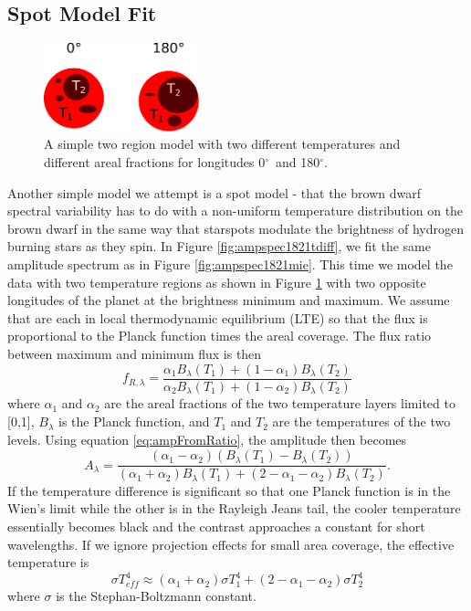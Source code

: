 \documentclass[twocolumn]{aastex6}
\newcommand{\degree}{$^\circ$}
\begin{document}
\subsection{Spot Model Fit}

\begin{figure}
\begin{centering}
\includegraphics[width=0.4\textwidth]{temperature_drawing.pdf}
\caption{A simple two region model with two different temperatures and different areal fractions for longitudes 0\degree\ and 180\degree.}\label{fig:tdiffschem}
\end{centering}
\end{figure}

Another simple model we attempt is a spot model - that the brown dwarf spectral variability has to do with a non-uniform temperature distribution on the brown dwarf in the same way that starspots modulate the brightness of hydrogen burning stars as they spin.
In Figure \ref{fig:ampspec1821tdiff}, we fit the same amplitude spectrum as in Figure \ref{fig:ampspec1821mie}.
This time we model the data with two temperature regions as shown in Figure \ref{fig:tdiffschem} with two opposite longitudes of the planet at the brightness minimum and maximum.
We assume that are each in local thermodynamic equilibrium (LTE) so that the flux is proportional to the Planck function times the areal coverage.
The flux ratio between maximum and minimum flux is then
\begin{equation}
f_{R,\lambda} = \frac{\alpha_1 B_\lambda(T_1) + (1-\alpha_1) B_\lambda(T_2)}{\alpha_2 B_\lambda(T_1) + (1-\alpha_2) B_\lambda(T_2)}
\end{equation}
where $\alpha_1$ and $\alpha_2$ are the areal fractions of the two temperature layers limited to [0,1], $B_\lambda$ is the Planck function, and $T_1$ and $T_2$ are the temperatures of the two levels.
Using equation \ref{eq:ampFromRatio}, the amplitude then becomes
\begin{equation}
A_\lambda = \frac{\left(\alpha_1 - \alpha_2 \right) \left(B_\lambda(T_1) - B_\lambda(T_2) \right)}{\left(\alpha_1 + \alpha_2\right) B_\lambda(T_1) + \left(2 - \alpha_1 - \alpha_2\right) B_\lambda(T_2)}.
\end{equation}
If the temperature difference is significant so that one Planck function is in the Wien's limit while the other is in the Rayleigh Jeans tail, the cooler temperature essentially becomes black and the contrast approaches a constant for short wavelengths.
If we ignore projection effects for small area coverage, the effective temperature is 
\begin{equation}
\sigma T_{eff}^4 \approx (\alpha_1 + \alpha_2) \sigma T_1^4 + (2 - \alpha_1 - \alpha_2) \sigma T_2^4
\end{equation}
where $\sigma$ is the Stephan-Boltzmann constant.
\end{document}
